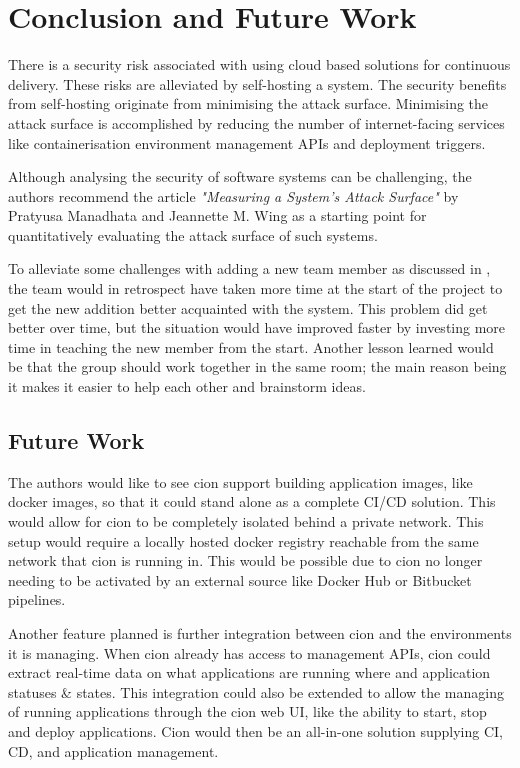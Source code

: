 \chapter{Conclusion and Future Work}
\label{chap:conclusion}
There is a security risk associated with using cloud based solutions for continuous delivery. These risks are alleviated by self-hosting a system. The security benefits from self-hosting originate from minimising the attack surface. Minimising the attack surface is accomplished by reducing the number of internet-facing services like containerisation environment management APIs and deployment triggers.

Although analysing the security of software systems can be challenging, the authors recommend the article \textit{"Measuring a System’s Attack Surface"} by Pratyusa Manadhata and Jeannette M. Wing as a starting point for quantitatively evaluating the attack surface of such systems.  

To alleviate some challenges with adding a new team member as discussed in , the team would in retrospect have taken more time at the start of the project to get the new addition better acquainted with the system. This problem did get better over time, but the situation would have improved faster by investing more time in teaching the new member from the start. Another lesson learned would be that the group should work together in the same room; the main reason being it makes it easier to help each other and brainstorm ideas. 


\section{Future Work}
The authors would like to see cion support building application images, like docker images, so that it could stand alone as a complete \acrshort{CI/CD} solution. This would allow for cion to be completely isolated behind a private network. This setup would require a locally hosted docker registry reachable from the same network that cion is running in. This would be possible due to cion no longer needing to be activated by an external source like Docker Hub or Bitbucket pipelines.

Another feature planned is further integration between cion and the environments it is managing. When cion already has access to management \acrshort{API}s, cion could extract real-time data on what applications are running where and application statuses \& states. This integration could also be extended to allow the managing of running applications through the cion web UI, like the ability to start, stop and deploy applications. Cion would then be an all-in-one solution supplying \acrlong{CI}, \acrlong{CD}, and application management.
